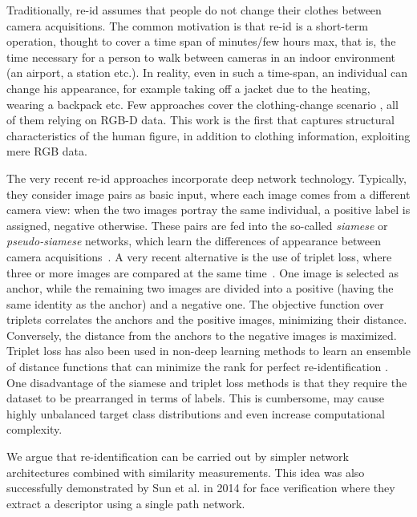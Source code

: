 \documentclass[10pt,journal,letterpaper,compsoc]{IEEEtran}
\begin{document}
Traditionally, re-id assumes that people do not change their clothes between camera acquisitions. The common motivation is that re-id is a short-term operation, thought to cover a time span of  minutes/few hours max, that is, the time necessary for a person to walk between cameras in an indoor environment (an airport, a station etc.). In reality, even in such a time-span, an individual can change his appearance, for example taking off a jacket due to the heating, wearing a backpack etc. Few approaches cover the clothing-change scenario \cite{munaro2014one,barbosa2012re}, all of them relying on RGB-D data. This work is the first that captures structural characteristics of the human figure, in addition to clothing information, exploiting mere RGB data.

The very recent re-id approaches incorporate deep network technology. Typically, they consider image pairs as basic input, where each image comes from a different camera view: when the two images portray the same individual, a positive label is assigned, negative otherwise. These pairs are fed into the so-called \emph{siamese} or \emph{pseudo-siamese} networks, which learn the differences of appearance between camera acquisitions~\cite{li2014deepreid,Ahmed15, mbdml,GATED,LSTM_REID,personnet}. A very recent alternative is the use of triplet loss, where three or more images are compared at the same time~\cite{deep_atrib,chen2017multi}. One image is selected as anchor, while the remaining two images are divided into a positive (having the same identity as the anchor) and a negative one. The objective function over triplets correlates the anchors and the positive images, minimizing their distance. Conversely, the distance from the anchors to the negative images is maximized. Triplet loss has also been used in non-deep learning methods to learn an ensemble of distance functions that can minimize the rank for perfect re-identification \cite{Paisitkriangkrai_2015_CVPR}. One disadvantage of the siamese and triplet loss methods is that they require the dataset to be prearranged in terms of labels. This is cumbersome, may cause highly unbalanced target class distributions and even increase computational complexity.

We argue that re-identification can be carried out by simpler network architectures combined with similarity measurements. This idea was also successfully demonstrated by Sun et al. in 2014 for face verification \cite{Sun2014} where they extract a descriptor using a single path network.
\end{document}
